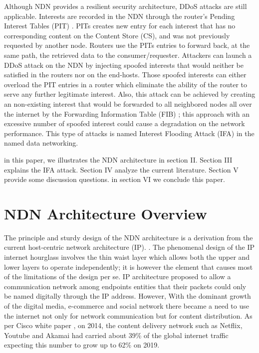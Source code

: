 \documentclass[conference]{IEEEtran}
\begin{document}
Although NDN provides a resilient security architecture, DDoS attacks are still applicable. Interests are recorded in the NDN through the router's Pending Interest Tables (PIT) \cite{Cheng2012}. PITs creates new entry for each interest that has no corresponding content on the Content Store (CS), and was not previously requested by another node. Routers use the PITs entries to forward back, at the same path, the retrieved data to the consumer/requester. Attackers can launch a DDoS attack on the NDN by injecting spoofed interests that would neither be satisfied in the routers nor on the end-hosts. Those spoofed interests can either overload the PIT entries in a router which eliminate the ability of the router to serve any further legitimate interest. Also, this attack can be achieved by creating an non-existing interest that would be forwarded to all neighbored nodes all over the internet by the Forwarding Information Table (FIB) \cite{Xin2016ANI}; this approach with an excessive number of spoofed interest could cause a degradation on the network performance. This type of attacks is named Interest Flooding Attack (IFA) in the named data networking. 

in this paper, we illustrates the NDN architecture in section II. Section III explains the IFA attack. Section IV analyze the current literature. Section V provide some discussion questions. in section VI we conclude this paper.   


\section{NDN Architecture Overview}
The principle and sturdy design of the NDN architecture is a derivation from the current host-centric network architecture (IP). \cite{Pan2011}. The phenomenal design of the IP internet hourglass involves the thin waist layer which allows both the upper and lower layers to operate independently; it is however the element that causes most of the limitations of the design per se. IP architecture proposed to allow a communication network among endpoints entities that their packets could only be named digitally through the IP address. However, With the dominant growth of the digital media, e-commerce and social network there became a need to use the internet not only for network communication but for content distribution. As per Cisco white paper \cite{Cisco2015}, on 2014, the content delivery network such as Netflix, Youtube and Akamai had carried about 39\% of the global internet traffic expecting this number to grow up to 62\% on 2019.
\end{document}
